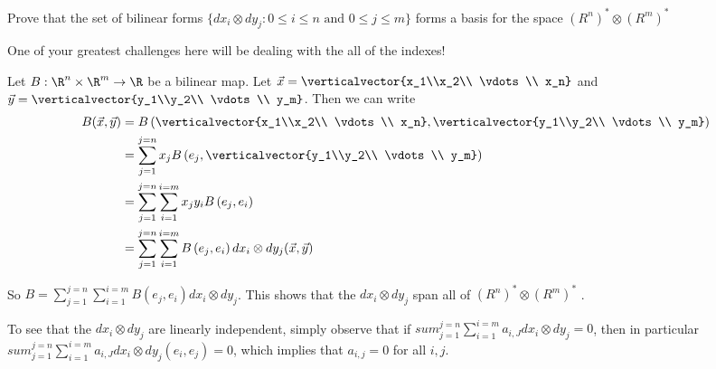 \documentclass{ximera}
\begin{document}
	Prove that the set of bilinear forms $\{ dx_i \otimes dy_j : 0 \leq i \leq n \text{ and } 0\leq j \leq m\}$ forms a basis for the space 
	$\left(R^n\right)^* \otimes \left(R^m\right)^*$ 
	\begin{warning}
		One of your greatest challenges here will be dealing with the all of the indexes!
	\end{warning}
	
	\begin{free-response}
		Let $B:\R^n \times \R^m \to \R$ be a bilinear map.  Let $\vec{x} = \verticalvector{x_1\\x_2\\ \vdots \\ x_n}$ and 
		$\vec{y} = \verticalvector{y_1\\y_2\\ \vdots \\ y_m}$. Then we can write
			\begin{align*}
				B(\vec{x},\vec{y})&=
				B\left( \verticalvector{x_1\\x_2\\ \vdots \\ x_n}, \verticalvector{y_1\\y_2\\ \vdots \\ y_m}\right) \\
				&= \sum_{j=1}^{j=n} x_jB\left( e_j, \verticalvector{y_1\\y_2\\ \vdots \\ y_m}\right)\\
				&= \sum_{j=1}^{j=n} \sum_{i=1}^{i=m} x_jy_i B\left( e_j , e_i\right)\\
				&= \sum_{j=1}^{j=n} \sum_{i=1}^{i=m} B\left( e_j,e_i\right) dx_i \otimes dy_j(\vec{x},\vec{y})
			\end{align*}
			
			So $B = \sum_{j=1}^{j=n} \sum_{i=1}^{i=m} B\left( e_j,e_i\right) dx_i \otimes dy_j$.  This shows that the $dx_i \otimes dy_j$ span all of 
			$\left(R^n\right)^* \otimes \left(R^m\right)^*$ .
			
			To see that the $dx_i \otimes dy_j$ are linearly independent, simply observe that if 
			$sum_{j=1}^{j=n} \sum_{i=1}^{i=m} a_{i,J} dx_i \otimes dy_j = 0$, then in particular
			$sum_{j=1}^{j=n} \sum_{i=1}^{i=m} a_{i,J} dx_i \otimes dy_j (e_i,e_j)= 0$, which implies that
			$a_{i,j} = 0$ for all $i,j$.
	\end{free-response}
	
\end{document}
